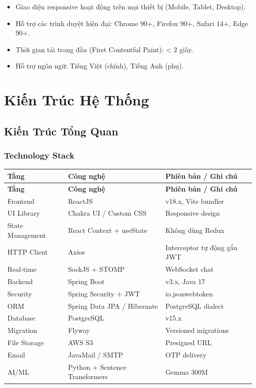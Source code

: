 \documentclass[12pt, a4paper]{report}
\begin{document}
\begin{itemize}
    \item Giao diện responsive hoạt động trên mọi thiết bị (Mobile, Tablet, Desktop).
    \item Hỗ trợ các trình duyệt hiện đại: Chrome 90+, Firefox 90+, Safari 14+, Edge 90+.
    \item Thời gian tải trang đầu (First Contentful Paint): < 2 giây.
    \item Hỗ trợ ngôn ngữ: Tiếng Việt (chính), Tiếng Anh (phụ).
\end{itemize}

\chapter{Kiến Trúc Hệ Thống}

\section{Kiến Trúc Tổng Quan}

\subsection{Technology Stack}

\begin{longtable}{|p{4cm}|p{4cm}|p{6cm}|}
\hline
\textbf{Tầng} & \textbf{Công nghệ} & \textbf{Phiên bản / Ghi chú} \\
\hline
\endfirsthead
\hline
\textbf{Tầng} & \textbf{Công nghệ} & \textbf{Phiên bản / Ghi chú} \\
\hline
\endhead
Frontend & ReactJS & v18.x, Vite bundler \\
\hline
UI Library & Chakra UI / Custom CSS & Responsive design \\
\hline
State Management & React Context + useState & Không dùng Redux \\
\hline
HTTP Client & Axios & Interceptor tự động gắn JWT \\
\hline
Real-time & SockJS + STOMP & WebSocket chat \\
\hline
Backend & Spring Boot & v3.x, Java 17 \\
\hline
Security & Spring Security + JWT & io.jsonwebtoken \\
\hline
ORM & Spring Data JPA / Hibernate & PostgreSQL dialect \\
\hline
Database & PostgreSQL & v15.x \\
\hline
Migration & Flyway & Versioned migrations \\
\hline
File Storage & AWS S3 & Presigned URL \\
\hline
Email & JavaMail / SMTP & OTP delivery \\
\hline
AI/ML & Python + Sentence Transformers & Gemma 300M \\
\hline
\end{longtable}
\end{document}
